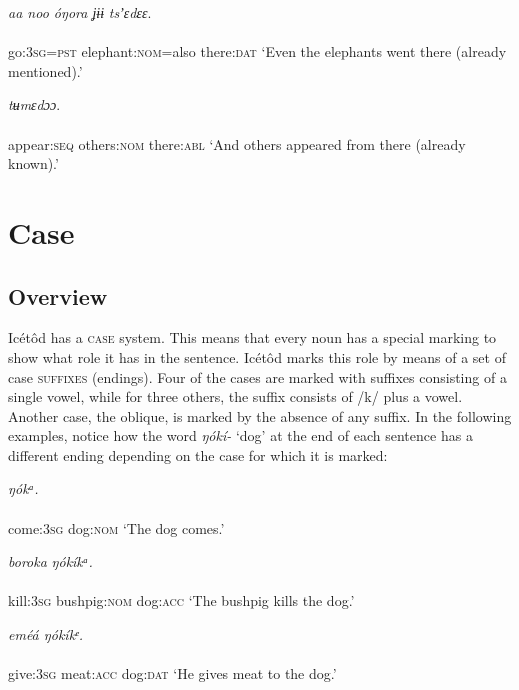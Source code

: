 \ea\label{ex:}
\textit{aa noo   óŋora ʝɨɨ}     \textit{tsʼɛdɛɛ}. \\
    \\
go:\textsc{3sg=pst}   elephant:\textsc{nom}=also   there:\textsc{dat}
\glt ‘Even the elephants went there (already mentioned).’ 
\z




\ea\label{ex:}
     \textit{tʉmɛdɔɔ}. \\
    \\
appear:\textsc{seq}   others:\textsc{nom}   there:\textsc{abl}
\glt ‘And others appeared from there (already known).’ 
\z




\section{Case}



\subsection{Overview}


Icétôd has a \textsc{case} system. This means that every noun has a special marking to show what role it has in the sentence. Icétôd marks this role by means of a set of case \textsc{suffixes} (endings). Four of the cases are marked with suffixes consisting of a single vowel, while for three others, the suffix consists of /k/ plus a vowel. Another case, the oblique, is marked by the absence of any suffix. In the following examples, notice how the word \textit{ŋókí-} ‘dog’ at the end of each sentence has a different ending depending on the case for which it is marked:




\ea\label{ex:}
     \textit{ŋókᵃ.} \\
    \\
come:\textsc{3sg}   dog:\textsc{nom}
\glt ‘The dog comes.’ 
\z




\ea\label{ex:}
     \textit{boroka}     \textit{ŋókíkᵃ.} \\
    \\
kill:\textsc{3sg}   bushpig:\textsc{nom}   dog:\textsc{acc}
\glt ‘The bushpig kills the dog.’ 
\z




\ea\label{ex:}
     \textit{eméá     ŋókíkᵉ.} \\
    \\
give:\textsc{3sg}   meat:\textsc{acc}   dog:\textsc{dat}
\glt ‘He gives meat to the dog.’ 
\z




